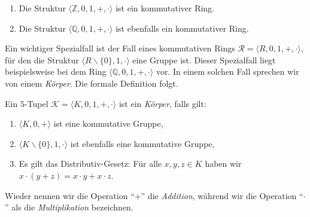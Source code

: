 \examples
\begin{enumerate}
\item Die Struktur $\langle \mathbb{Z}, 0, 1, +, \cdot \rangle$ ist ein kommutativer Ring.  
\item Die Struktur $\langle \mathbb{Q}, 0, 1, +, \cdot \rangle$ ist ebenfalls ein kommutativer Ring.   \eoxs
\end{enumerate}

\begin{center}
\colorbox{red}{}
\end{center}

Ein wichtiger Spezialfall ist der Fall eines kommutativen Rings 
$\mathcal{R} = \langle R, 0, 1, +, \cdot \rangle$, f\"{u}r den die Struktur $\langle R \backslash \{0\}, 1, \cdot \rangle$
eine Gruppe ist.  Dieser Spezialfall liegt beispielsweise bei dem Ring  
$\langle \mathbb{Q}, 0, 1, +, \cdot \rangle$ vor.  In einem solchen Fall sprechen wir von einem {\color{blue}\emph{K\"{o}rper}}.  Die formale
Definition folgt.


\begin{Definition}[K\"{o}rper]
Ein $5$-Tupel $\mathcal{K} = \langle K, 0, 1, +, \cdot \rangle$ ist ein {\color{blue}\emph{K\"{o}rper}}, falls gilt:
\begin{enumerate}
\item $\langle K, 0, + \rangle$ ist eine kommutative Gruppe,
\item $\langle K \backslash \{ 0 \}, 1, \cdot \rangle$ ist ebenfalls eine kommutative Gruppe,
\item Es gilt das Distributiv-Gesetz: F\"{u}r alle $x, y,z \in K$ haben wir
      \\[0.2cm]
      \hspace*{1.3cm} 
      $x \cdot (y + z) = x \cdot y + x \cdot z$.
\end{enumerate}
Wieder nennen wir die  Operation ``$+$'' die \emph{Addition}, w\"{a}hrend wir die Operation ``$\cdot$'' 
als die \emph{Multiplikation} bezeichnen. \eoxs
\end{Definition}


